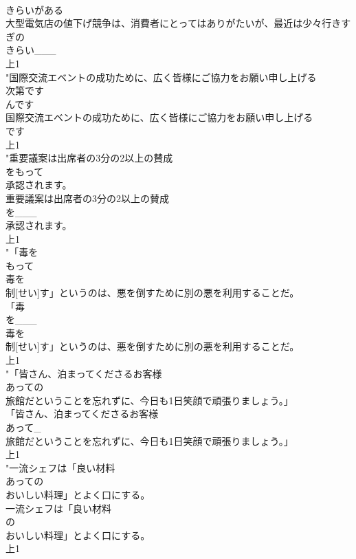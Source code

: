 \documentclass[8pt]{extreport}
\begin{document}
\begin{CJK}{UTF8}{min}
\\	きらいがある
\\	大型電気店の値下げ競争は、消費者にとってはありがたいが、最近は少々行きすぎの
\\	きらい___
\\	上1
\\	"国際交流エベントの成功ために、広く皆様にご協力をお願い申し上げる
\\	次第です
\\	んです 
\\	国際交流エベントの成功ために、広く皆様にご協力をお願い申し上げる
\\	です
\\	上1
\\	"重要議案は出席者の3分の2以上の賛成
\\	をもって
\\	承認されます。
\\	重要議案は出席者の3分の2以上の賛成
\\	を___
\\	承認されます。
\\	上1
\\	"「毒を
\\	もって
\\	毒を
\\	制[せい]す」というのは、悪を倒すために別の悪を利用することだ。
\\	「毒
\\	を___
\\	毒を
\\	制[せい]す」というのは、悪を倒すために別の悪を利用することだ。
\\	上1
\\	"「皆さん、泊まってくださるお客様
\\	あっての
\\	旅館だということを忘れずに、今日も1日笑顔で頑張りましょう。」
\\	「皆さん、泊まってくださるお客様
\\	あって_
\\	旅館だということを忘れずに、今日も1日笑顔で頑張りましょう。」
\\	上1
\\	"一流シェフは「良い材料
\\	あっての
\\	おいしい料理」とよく口にする。
\\	一流シェフは「良い材料
\\	の
\\	おいしい料理」とよく口にする。
\\	上1

\end{CJK}
\end{document}
